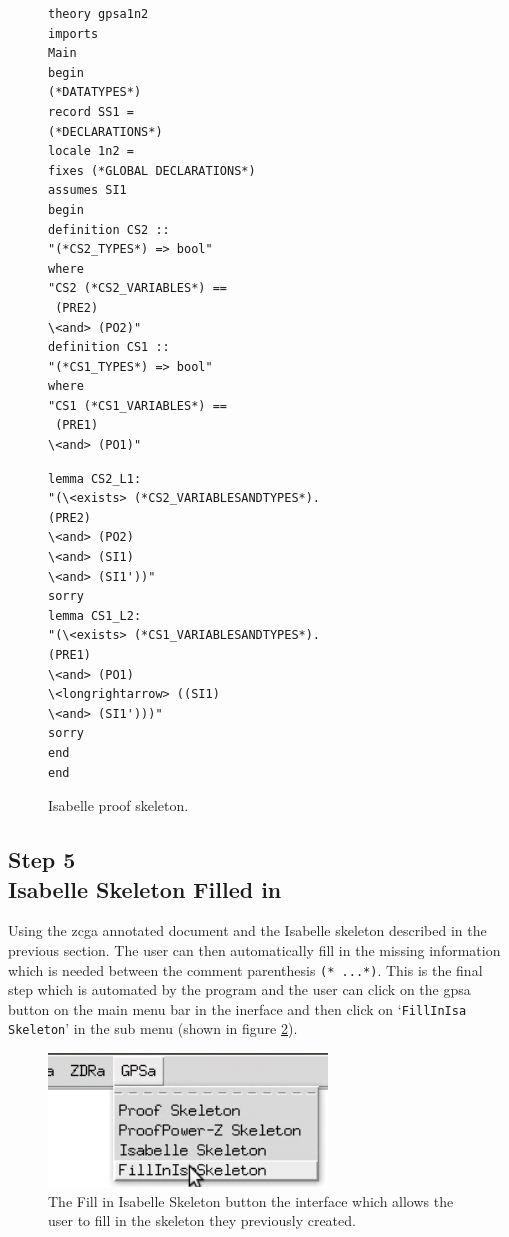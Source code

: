 \begin{figure}[H]
\centering
\begin{minipage}{0.45\textwidth}
\centering
\begin{scriptsize}
\begin{BVerbatim}
theory gpsa1n2
imports 
Main 
begin 
(*DATATYPES*)
record SS1 = 
(*DECLARATIONS*)
locale 1n2 = 
fixes (*GLOBAL DECLARATIONS*) 
assumes SI1
begin
definition CS2 :: 
"(*CS2_TYPES*) => bool"
where 
"CS2 (*CS2_VARIABLES*) ==
 (PRE2)
\<and> (PO2)"
definition CS1 :: 
"(*CS1_TYPES*) => bool"
where 
"CS1 (*CS1_VARIABLES*) ==
 (PRE1)
\<and> (PO1)"
\end{BVerbatim}
\end{scriptsize}
\end{minipage}\hfill
\begin{minipage}{0.45\textwidth}
\begin{scriptsize}
\begin{BVerbatim}
lemma CS2_L1:
"(\<exists> (*CS2_VARIABLESANDTYPES*).
(PRE2)
\<and> (PO2)
\<and> (SI1)
\<and> (SI1'))"
sorry
lemma CS1_L2:
"(\<exists> (*CS1_VARIABLESANDTYPES*).
(PRE1)
\<and> (PO1)
\<longrightarrow> ((SI1)
\<and> (SI1')))"
sorry
end
end
\end{BVerbatim}
\end{scriptsize}
\end{minipage}
\caption{Isabelle proof skeleton. \label{fig:isaFullexample}}
\end{figure}

\subsection{Step 5\\Isabelle Skeleton Filled in}

Using the \gls{zcga} annotated document and the Isabelle skeleton described in the previous section. The user can then automatically fill in the missing information which is needed between the comment parenthesis \verb|(* ...*)|. This is the final step which is automated by the program and the user can click on the \gls{gpsa} button on the main menu bar in the inerface and then click on `\texttt{FillInIsa Skeleton}' in the sub menu (shown in figure \ref{fig:fillinisa}).

\begin{figure}[H]
\centering
\includegraphics[scale=0.45]{Figures/fullexample/fillinisa.png}
\caption{The Fill in Isabelle Skeleton button the interface which allows the user to fill in the skeleton they previously created. \label{fig:fillinisa}}
\end{figure}

